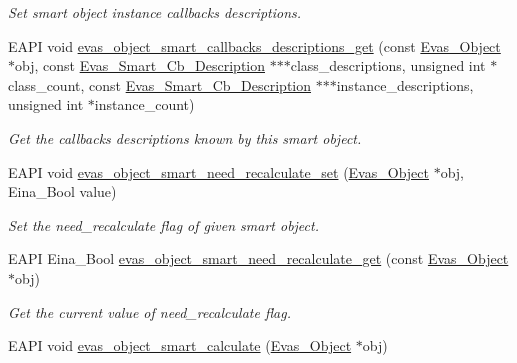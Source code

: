 \begin{DoxyCompactItemize}
\begin{DoxyCompactList}\small\item\em Set smart object instance callbacks descriptions. \item\end{DoxyCompactList}\item 
EAPI void \hyperlink{group__Evas__Smart__Object__Group_gaf58d78bc21229defb9eafd541063391d}{evas\_\-object\_\-smart\_\-callbacks\_\-descriptions\_\-get} (const \hyperlink{group__Evas__Object__Group_ga9e19e6dd1f517a0ba437c0114d3e7c97}{Evas\_\-Object} $\ast$obj, const \hyperlink{struct__Evas__Smart__Cb__Description}{Evas\_\-Smart\_\-Cb\_\-Description} $\ast$$\ast$$\ast$class\_\-descriptions, unsigned int $\ast$class\_\-count, const \hyperlink{struct__Evas__Smart__Cb__Description}{Evas\_\-Smart\_\-Cb\_\-Description} $\ast$$\ast$$\ast$instance\_\-descriptions, unsigned int $\ast$instance\_\-count)
\begin{DoxyCompactList}\small\item\em Get the callbacks descriptions known by this smart object. \item\end{DoxyCompactList}\item 
EAPI void \hyperlink{group__Evas__Smart__Object__Group_ga58c34092eac9bfe6878b8e6ebc026de1}{evas\_\-object\_\-smart\_\-need\_\-recalculate\_\-set} (\hyperlink{group__Evas__Object__Group_ga9e19e6dd1f517a0ba437c0114d3e7c97}{Evas\_\-Object} $\ast$obj, Eina\_\-Bool value)
\begin{DoxyCompactList}\small\item\em Set the need\_\-recalculate flag of given smart object. \item\end{DoxyCompactList}\item 
EAPI Eina\_\-Bool \hyperlink{group__Evas__Smart__Object__Group_ga38be19a4f09b071b3d984996b8f9b3ee}{evas\_\-object\_\-smart\_\-need\_\-recalculate\_\-get} (const \hyperlink{group__Evas__Object__Group_ga9e19e6dd1f517a0ba437c0114d3e7c97}{Evas\_\-Object} $\ast$obj)
\begin{DoxyCompactList}\small\item\em Get the current value of need\_\-recalculate flag. \item\end{DoxyCompactList}\item 
EAPI void \hyperlink{group__Evas__Smart__Object__Group_ga8013936b96d99d2ff375ca2b0b287f39}{evas\_\-object\_\-smart\_\-calculate} (\hyperlink{group__Evas__Object__Group_ga9e19e6dd1f517a0ba437c0114d3e7c97}{Evas\_\-Object} $\ast$obj)

\end{DoxyCompactItemize}
